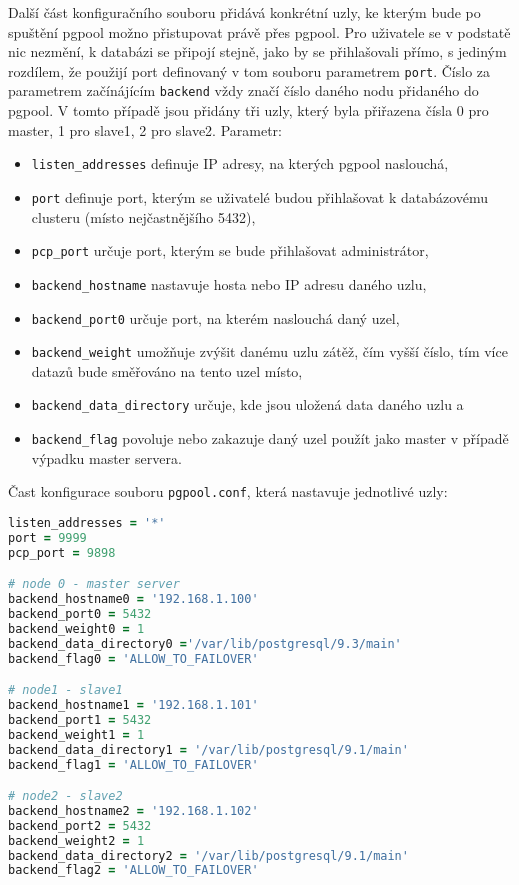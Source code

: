 Další část konfiguračního souboru přidává konkrétní uzly, ke kterým bude po spuštění pgpool možno přistupovat právě přes pgpool. Pro uživatele se v podstatě nic nezmění, k databázi se připojí stejně, jako by se přihlašovali přímo, s jediným rozdílem, že použijí port definovaný v tom souboru parametrem \texttt{port}. Číslo za parametrem začínájícím \texttt{backend} vždy značí číslo daného nodu přidaného do pgpool. V tomto případě jsou přidány tři uzly, který byla přiřazena čísla 0 pro master, 1 pro slave1, 2 pro slave2. Parametr: 
\begin{itemize}
\item \texttt{listen\_addresses} definuje IP adresy, na kterých pgpool naslouchá, 
\item \texttt{port} definuje port, kterým se uživatelé budou přihlašovat k databázovému clusteru (místo nejčastnějšího 5432), 
\item \texttt{pcp\_port} určuje port, kterým se bude přihlašovat administrátor, 
\item \texttt{backend\_hostname} nastavuje hosta nebo IP adresu daného uzlu, 
\item \texttt{backend\_port0} určuje port, na kterém naslouchá daný uzel, 
\item \texttt{backend\_weight} umožňuje zvýšit danému uzlu zátěž, čím vyšší číslo, tím více datazů bude směřováno na tento uzel místo, 
\item \texttt{backend\_data\_directory} určuje, kde jsou uložená data daného uzlu a 
\item \texttt{backend\_flag} povoluje nebo zakazuje daný uzel použít jako master v případě výpadku master servera.
\end{itemize}

Čast konfigurace souboru \texttt{pgpool.conf}, která nastavuje jednotlivé uzly:
\begin{lstlisting}[language=ruby]
listen_addresses = '*'
port = 9999 		
pcp_port = 9898 	

# node 0 - master server
backend_hostname0 = '192.168.1.100' 			
backend_port0 = 5432 					
backend_weight0 = 1					
backend_data_directory0 ='/var/lib/postgresql/9.3/main'
backend_flag0 = 'ALLOW_TO_FAILOVER'	      

# node1 - slave1
backend_hostname1 = '192.168.1.101'
backend_port1 = 5432
backend_weight1 = 1
backend_data_directory1 = '/var/lib/postgresql/9.1/main'
backend_flag1 = 'ALLOW_TO_FAILOVER'

# node2 - slave2
backend_hostname2 = '192.168.1.102'
backend_port2 = 5432
backend_weight2 = 1
backend_data_directory2 = '/var/lib/postgresql/9.1/main'
backend_flag2 = 'ALLOW_TO_FAILOVER'
\end{lstlisting}

